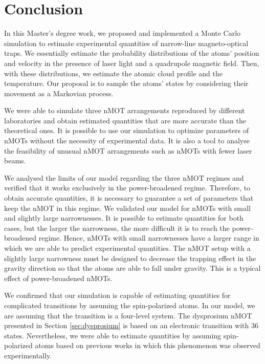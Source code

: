 %
\chapter{Conclusion}
\label{ch:conclusion}
%

In this Master's degree work, we proposed and implemented a Monte Carlo simulation to estimate experimental quantities of narrow-line magneto-optical traps. We essentially estimate the probability distributions of the atoms' position and velocity in the presence of laser light and a quadrupole magnetic field. Then, with these distributions, we estimate the atomic cloud profile and the temperature. Our proposal is to sample the atoms' states by considering their movement as a Markovian process.

We were able to simulate three nMOT arrangements reproduced by different laboratories and obtain estimated quantities that are more accurate than the theoretical ones. It is possible to use our simulation to optimize parameters of nMOTs without the necessity of experimental data. It is also a tool to analyse the feasibility of unusual nMOT arrangements such as nMOTs with fewer laser beams.

We analysed the limits of our model regarding the three nMOT regimes and verified that it works exclusively in the power-broadened regime. Therefore, to obtain accurate quantities, it is necessary to guarantee a set of parameters that keep the nMOT in this regime. We validated our model for nMOTs with small and slightly large narrownesses. It is possible to estimate quantities for both cases, but the larger the narrowness, the more difficult it is to reach the power-broadened regime. Hence, nMOTs with small narrownesses have a larger range in which we are able to predict experimental quantities. The nMOT setup with a slightly large narrowness must be designed to decrease the trapping effect in the gravity direction so that the atoms are able to fall under gravity. This is a typical effect of power-broadened nMOTs.

We confirmed that our simulation is capable of estimating quantities for complicated transitions by assuming the spin-polarized atoms. In our model, we are assuming that the transition is a four-level system. The dysprosium nMOT presented in Section \ref{sec:dysprosium} is based on an electronic transition with 36 states. Nevertheless, we were able to estimate quantities by assuming spin-polarized atoms based on previous works in which this phenomenon was observed experimentally.


